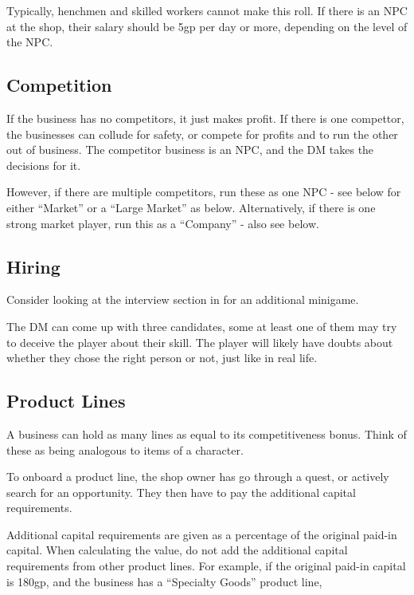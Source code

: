 \documentclass[twocolumn]{dndbook}
\begin{document}
Typically, henchmen and skilled workers cannot make this roll. If there is an NPC at the shop,
their salary should be 5gp per day or more, depending on the level of the NPC.

\subsection{Competition}
If the business has no competitors, it just makes profit.
If there is one compettor, the businesses can collude for safety, or compete for profits
and to run the other out of business. The competitor business is an NPC,
and the DM takes the decisions for it.\par

However, if there are multiple competitors, run these as one NPC - see below
for either ``Market'' or a ``Large Market'' as below.
Alternatively, if there is one strong
market player, run this as a ``Company'' - also see below.

\subsection{Hiring}

Consider looking at the interview section in 
for an additional minigame.\par

The DM can come up with three candidates, some at least one of them may try to deceive the player about their skill.
The player will likely have doubts about whether they chose the right person or not, just like in real life.\par

\subsection{Product Lines}

A business can hold as many lines as equal to its competitiveness bonus.
Think of these as being analogous to items of a character.\par

To onboard a product line, the shop owner has go through a quest, or
actively search for an opportunity. They then have to pay the
additional capital requirements.\par

Additional capital requirements are given as a percentage of the original paid-in capital.
When calculating the value, do not add the additional capital requirements from other product lines.
For example, if the original paid-in capital is 180gp, and the business has a ``Specialty Goods'' product line,
\end{document}
